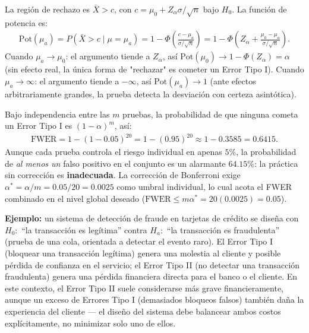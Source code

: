 \begin{solproblema}
	La región de rechazo es $\bar X>c$, con $c=\mu_0+Z_\alpha\sigma/\sqrt n$ bajo $H_0$. La función de potencia es:
	\begin{align*}
		\text{Pot}(\mu_a) = P(\bar X>c\mid\mu=\mu_a) = 1-\Phi\left(\frac{c-\mu_a}{\sigma/\sqrt n}\right) = 1-\Phi\left(Z_\alpha+\frac{\mu_0-\mu_a}{\sigma/\sqrt n}\right).
	\end{align*}
	Cuando $\mu_a\to\mu_0$: el argumento tiende a $Z_\alpha$, así $\text{Pot}(\mu_0)\to1-\Phi(Z_\alpha)=\alpha$ (sin efecto real, la única forma de "rechazar" es cometer un Error Tipo I). Cuando $\mu_a\to\infty$: el argumento tiende a $-\infty$, así $\text{Pot}(\mu_a)\to1$ (ante efectos arbitrariamente grandes, la prueba detecta la desviación con certeza asintótica).
\end{solproblema}

\begin{solproblema}[prob:66368eb]
	Bajo independencia entre las $m$ pruebas, la probabilidad de que ninguna cometa un Error Tipo I es $(1-\alpha)^m$, así:
	\begin{align*}
		\text{FWER} = 1-(1-0.05)^{20} = 1-(0.95)^{20} \approx1-0.3585 = 0.6415.
	\end{align*}
	Aunque cada prueba controla el riesgo individual en apenas $5\%$, la probabilidad de \emph{al menos un} falso positivo en el conjunto es un alarmante $64.15\%$: la práctica sin corrección es \textbf{inadecuada}. La corrección de Bonferroni exige $\alpha^* = \alpha/m = 0.05/20 = 0.0025$ como umbral individual, lo cual acota el FWER combinado en el nivel global deseado ($\text{FWER}\le m\alpha^*=20(0.0025)=0.05$).
\end{solproblema}

\begin{solproblema}[prob:d04b6da]
	\textbf{Ejemplo:} un sistema de detección de fraude en tarjetas de crédito se diseña con $H_0:$ ``la transacción es legítima'' contra $H_a:$ ``la transacción es fraudulenta'' (prueba de una cola, orientada a detectar el evento raro). El Error Tipo I (bloquear una transacción legítima) genera una molestia al cliente y posible pérdida de confianza en el servicio; el Error Tipo II (no detectar una transacción fraudulenta) genera una pérdida financiera directa para el banco o el cliente. En este contexto, el Error Tipo II suele considerarse más grave financieramente, aunque un exceso de Errores Tipo I (demasiados bloqueos falsos) también daña la experiencia del cliente — el diseño del sistema debe balancear ambos costos explícitamente, no minimizar solo uno de ellos.
\end{solproblema}

